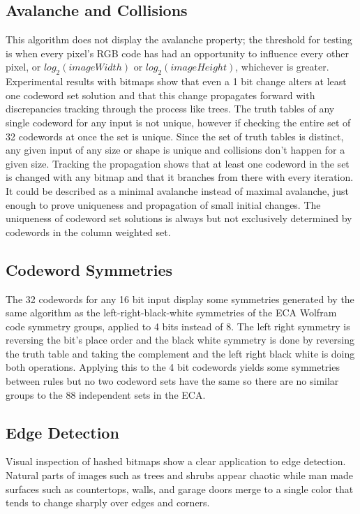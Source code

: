 \documentclass[11pt]{article}
\begin{document}
\subsection{Avalanche and Collisions}
This algorithm does not display the avalanche property; the threshold for testing is when every pixel's RGB code has had an opportunity to influence every other pixel, or $log_2(imageWidth)$ or $log_2(imageHeight)$, whichever is greater. Experimental results with bitmaps show that even a 1 bit change alters at least one codeword set solution and that this change propagates forward with discrepancies tracking through the process like trees. The truth tables of any single codeword for any input is not unique, however if checking the entire set of 32 codewords at once the set is unique. Since the set of truth tables is distinct, any given input of any size or shape is unique and collisions don't happen for a given size. Tracking the propagation shows that at least one codeword in the set is changed with any bitmap and that it branches from there with every iteration. It could be described as a minimal avalanche instead of maximal avalanche, just enough to prove uniqueness and propagation of small initial changes. The uniqueness of codeword set solutions is always but not exclusively determined by codewords in the column weighted set.\\

\subsection{Codeword Symmetries}
The 32 codewords for any 16 bit input display some symmetries generated by the same algorithm as the left-right-black-white symmetries of the ECA Wolfram code symmetry groups, applied to 4 bits instead of 8. The left right symmetry is reversing the bit's place order and the black white symmetry is done by reversing the truth table and taking the complement and the left right black white is doing both operations. Applying this to the 4 bit codewords yields some symmetries between rules but no two codeword sets have the same so there are no similar groups to the 88 independent sets in the ECA.\cite{Wolfram}\\

\subsection{Edge Detection}

Visual inspection of hashed bitmaps show a clear application to edge detection. Natural parts of images such as trees and shrubs appear chaotic while man made surfaces such as countertops, walls, and garage doors merge to a single color that tends to change sharply over edges and corners.\\
\end{document}
